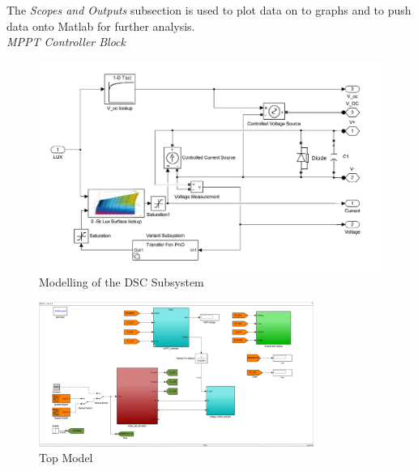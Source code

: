The \textit{Scopes and Outputs} subsection is used to plot data on to graphs and to push data onto Matlab for further analysis.\\

\textit{\ac{MPPT} Controller Block}

\begin{figure}[H]
	  \begin{center}
		  \includegraphics[width=\textwidth]{images/PV_block_Model}
		  \caption{Modelling of the DSC Subsystem }
		  \label{fig:PV_block_Model}
	  \end{center}
  \end{figure}

\begin{figure}[H]
  \begin{center}
	  \includegraphics[width=0.8\textwidth]{images/Top_level_mod}
	  \caption{Top Model }
	  \label{fig:Model_top}
  \end{center}
\end{figure}

